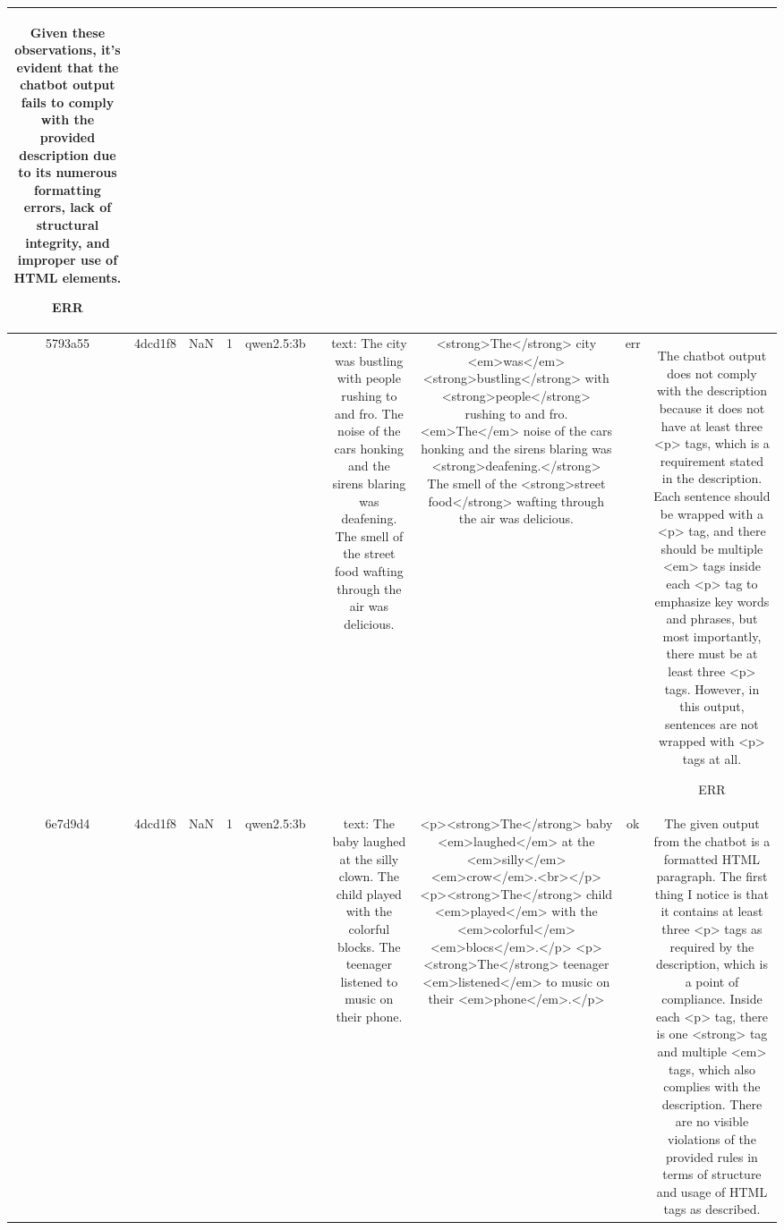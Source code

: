 \begin{table}[h!]
\begin{tabular}{|c|c|c|c|c|c|c|c|c|c|}
Given these observations, it's evident that the chatbot output fails to comply with the provided description due to its numerous formatting errors, lack of structural integrity, and improper use of HTML elements.

ERR\\
\hline
5793a55 & 4dcd1f8 & NaN & 1 & qwen2.5:3b &  & text: The city was bustling with people rushing to and fro. The noise of the cars honking and the sirens blaring was deafening. The smell of the street food wafting through the air was delicious. & <strong>The</strong> city <em>was</em> <strong>bustling</strong> with <strong>people</strong> rushing to and fro. <em>The</em> noise of the cars honking and the sirens blaring was <strong>deafening.</strong> The smell of the <strong>street food</strong> wafting through the air was delicious. & err & The chatbot output does not comply with the description because it does not have at least three <p> tags, which is a requirement stated in the description. Each sentence should be wrapped with a <p> tag, and there should be multiple <em> tags inside each <p> tag to emphasize key words and phrases, but most importantly, there must be at least three <p> tags. However, in this output, sentences are not wrapped with <p> tags at all.

ERR\\
\hline
6e7d9d4 & 4dcd1f8 & NaN & 1 & qwen2.5:3b &  & text: The baby laughed at the silly clown. The child played with the colorful blocks. The teenager listened to music on their phone. & <p><strong>The</strong> baby <em>laughed</em> at the <em>silly</em> <em>crow</em>.<br></p>
<p><strong>The</strong> child <em>played</em> with the <em>colorful</em> <em>blocs</em>.</p>
<p><strong>The</strong> teenager <em>listened</em> to music on their <em>phone</em>.</p> & ok & The given output from the chatbot is a formatted HTML paragraph. The first thing I notice is that it contains at least three <p> tags as required by the description, which is a point of compliance. Inside each <p> tag, there is one <strong> tag and multiple <em> tags, which also complies with the description. There are no visible violations of the provided rules in terms of structure and usage of HTML tags as described.


\end{tabular}
\end{table}

